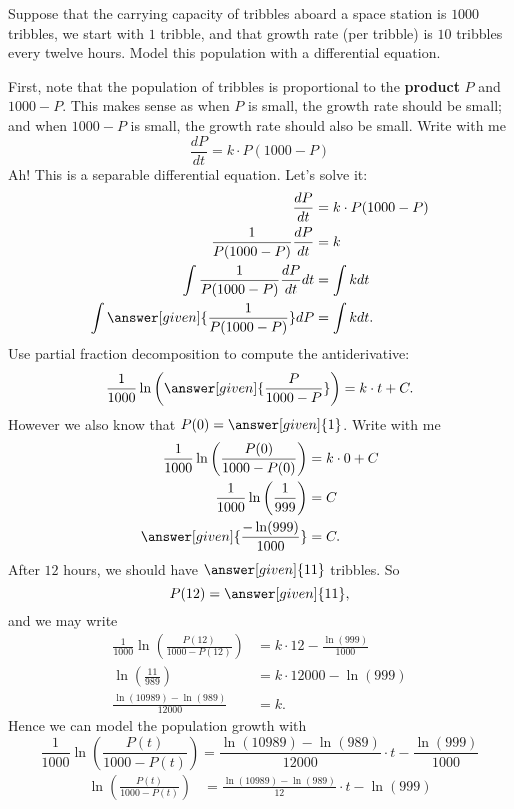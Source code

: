 \documentclass{ximera}
\begin{document}
\begin{example}
Suppose that the carrying capacity of tribbles aboard a space station
is $1000$ tribbles, we start with $1$ tribble, and that growth rate
(per tribble) is $10$ tribbles every twelve hours. Model this
population with a differential equation.
\begin{explanation}
  First, note that the population of tribbles is proportional to the
  \textbf{product} $P$ and $1000-P$. This makes sense as when $P$ is
  small, the growth rate should be small; and when $1000-P$ is small,
  the growth rate should also be small. Write with me
  \[
  \frac{dP}{dt}  = k \cdot P (1000-P)
  \]
  Ah! This is a separable differential equation. Let's solve it:
  \begin{align*}
    \frac{dP}{dt}  &= k \cdot P (1000-P)\\
    \frac{1}{P (1000-P)}\frac{dP}{dt}  &= k \\
    \int \frac{1}{P (1000-P)}\frac{dP}{dt} dt  &= \int k dt \\
    \int \answer[given]{\frac{1}{P (1000-P)}} dP  &= \int k dt.
  \end{align*}
  Use partial fraction decomposition to compute the antiderivative:
  \[
    \frac{1}{1000}\ln\left(\answer[given]{\frac{P}{1000-P}}\right)   = k\cdot t + C.
  \]
  However we also know that $P(0) = \answer[given]{1}$. Write with me
  \begin{align*}
      \frac{1}{1000}\ln\left(\frac{P(0)}{1000-P(0)}\right)  &= k\cdot 0 + C\\
      \frac{1}{1000}\ln\left(\frac{1}{999}\right)  &= C\\
      \answer[given]{\frac{-\ln(999)}{1000}}  &= C.
  \end{align*}
  After $12$ hours, we should have $\answer[given]{11}$ tribbles. So 
  \[
  P(12) = \answer[given]{11},
  \]
  and we may write
  \begin{align*}
    \frac{1}{1000}\ln\left(\frac{P(12)}{1000-P(12)}\right) &= k\cdot 12-\frac{\ln(999)}{1000}\\
    \ln\left(\frac{11}{989}\right) &= k\cdot 12000-\ln(999) \\
    \frac{\ln(10989)-\ln(989)}{12000} &= k.
  \end{align*}
  Hence we can model the population growth with
  \[
  \frac{1}{1000}\ln\left(\frac{P(t)}{1000-P(t)}\right) = \frac{\ln(10989)-\ln(989)}{12000}\cdot t - \frac{\ln(999)}{1000}
  \]
  \begin{align*}
    \ln\left(\frac{P(t)}{1000-P(t)}\right)  &= \frac{\ln(10989)-\ln(989)}{12}\cdot t - \ln(999)\\

\end{align*}
\end{explanation}
\end{example}
\end{document}
